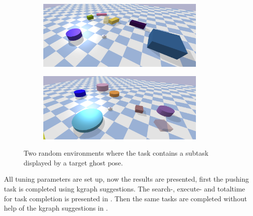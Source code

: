 \begin{figure}[H]
    \centering
    \begin{subfigure}{\textwidth}
    \centering
    \includegraphics[width=0.9\textwidth]{figures/results/random_1}
    \end{subfigure}

    \vspace{0.2cm}
    \begin{subfigure}{\textwidth}
    \centering
    \includegraphics[width=0.9\textwidth]{figures/results/random_2}
    \end{subfigure}
    \caption{Two random environments where the task contains a subtask displayed by a target ghost pose.}%
    \label{fig:random_environnment}
\end{figure}

All tuning parameters are set up, now the results are presented, first the pushing task is completed using \ac{kgraph} suggestions. The search-, execute- and totaltime for task completion is presented in . Then the same tasks are completed without help of the \ac{kgraph} suggestions in . 

